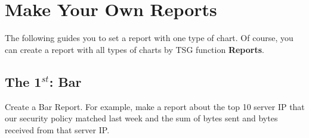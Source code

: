 \section*{\hypertarget{link:Make Your Own Reports}{Make Your Own Reports}}
\label{sec:appendix_f:report}

The following guides you to set a report with one type of chart. Of course, you can create a report with all types of charts by TSG function \textbf{Reports}.

\subsection*{\hypertarget{link:The 1st: Bar}{The 1$^{st}$: Bar}}
\label{sec:appendix_f:report:bar}

Create a Bar Report. For example, make a report about the top 10 server IP that our security policy matched last week and the sum of bytes sent and bytes received from that server IP.

